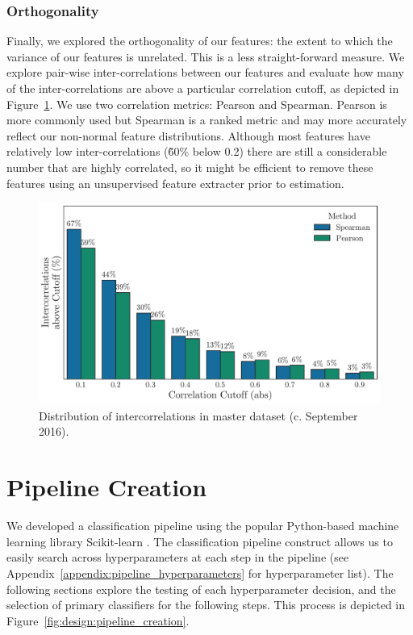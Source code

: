 \documentclass[../thesis/thesis.tex]{subfiles}
\begin{document}
\subsubsection{Orthogonality}

Finally, we explored the orthogonality of our features: the extent to which the variance of our features is unrelated. This is a less straight-forward measure. We explore pair-wise inter-correlations between our features and evaluate how many of the inter-correlations are above a particular correlation cutoff, as depicted in Figure~\ref{fig:design:orthogonality}. We use two correlation metrics: Pearson and Spearman. Pearson is more commonly used but Spearman is a ranked metric and may more accurately reflect our non-normal feature distributions. Although most features have relatively low inter-correlations (\~60\% below 0.2) there are still a considerable number that are highly correlated, so it might be efficient to remove these features using an unsupervised feature extracter prior to estimation.

\begin{figure}[!htb]
    \centering
    \includegraphics[width=\textwidth]{../figures/design/orthogonality}
    \caption[Dataset orthogonality]{Distribution of intercorrelations in master dataset (c. September 2016).}
    \label{fig:design:orthogonality}
\end{figure}

\section{Pipeline Creation}

We developed a classification pipeline using the popular Python-based machine learning library Scikit-learn \cite{pedregosa2011}. The classification pipeline construct allows us to easily search across hyperparameters at each step in the pipeline (see Appendix~\ref{appendix:pipeline_hyperparameters} for hyperparameter list). The following sections explore the testing of each hyperparameter decision, and the selection of primary classifiers for the following steps. This process is depicted in Figure~\ref{fig:design:pipeline_creation}.
\end{document}
